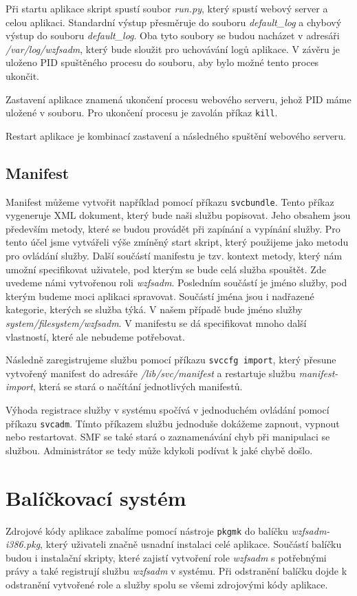 Při startu aplikace skript spustí soubor \emph{run.py}, který spustí webový server a celou aplikaci. Standardní výstup přesměruje do souboru \emph{default\_log} a chybový výstup do souboru \emph{default\_log}. Oba tyto soubory se budou nacházet v adresáři \emph{/var/log/wzfsadm}, který bude sloužit pro uchovávání logů aplikace. V závěru je uloženo PID spuštěného procesu do souboru, aby bylo možné tento proces ukončit.

Zastavení aplikace znamená ukončení procesu webového serveru, jehož PID máme uložené v souboru. Pro ukončení procesu je zavolán příkaz \verb|kill|.

Restart aplikace je kombinací zastavení a následného spuštění webového serveru.
\subsection{Manifest}
Manifest můžeme vytvořit například pomocí příkazu \verb|svcbundle|. Tento příkaz vygeneruje XML dokument, který bude naši službu popisovat. Jeho obsahem jsou především metody, které se budou provádět při zapínání a vypínání služby. Pro tento účel jsme vytvářeli výše zmíněný start skript, který použijeme jako metodu pro ovládání služby. Další součástí manifestu je tzv. kontext metody, který nám umožní specifikovat uživatele, pod kterým se bude celá služba spouštět. Zde uvedeme námi vytvořenou roli \emph{wzfsadm}. Posledním součástí je jméno služby, pod kterým budeme moci aplikaci spravovat. Součástí jména jsou i nadřazené kategorie, kterých se služba týká. V našem případě bude jméno služby \emph{system/filesystem/wzfsadm}. V manifestu se dá specifikovat mnoho další vlastností, které ale nebudeme potřebovat.

Následně zaregistrujeme službu pomocí příkazu \verb|svccfg import|, který přesune vytvořený manifest do adresáře \emph{/lib/svc/manifest} a restartuje službu \emph{manifest-import}, která se stará o načítání jednotlivých manifestů.

Výhoda registrace služby v systému spočívá v jednoduchém ovládání pomocí příkazu \verb|svcadm|. Tímto příkazem službu jednoduše dokážeme zapnout, vypnout nebo restartovat.
SMF se také stará o zaznamenávání chyb při manipulaci se službou. Administrátor se tedy může kdykoli podívat k jaké chybě došlo.
\section{Balíčkovací systém}
Zdrojové kódy aplikace zabalíme pomocí nástroje \verb|pkgmk| do balíčku \emph{wzfsadm-i386.pkg}, který uživateli značně usnadní instalaci celé aplikace. Součástí balíčku budou i instalační skripty, které zajistí vytvoření role \emph{wzfsadm} s potřebnými právy a také registrují službu \emph{wzfsadm} v systému. Při odstranění balíčku dojde k odstranění vytvořené role a služby spolu se všemi zdrojovými kódy aplikace.
